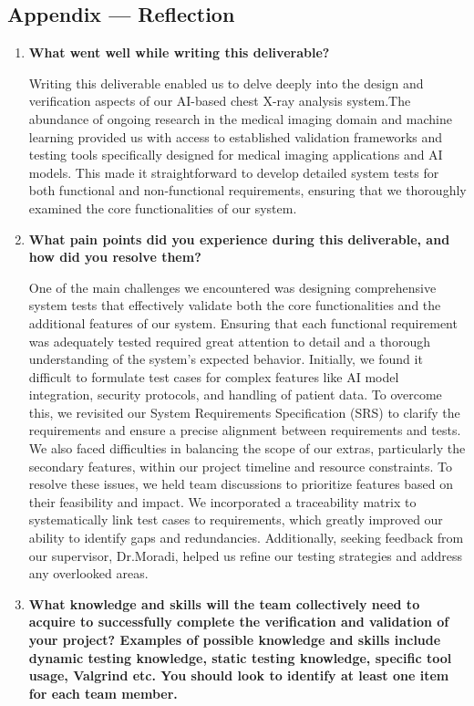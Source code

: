 \documentclass[12pt, titlepage]{article}
\begin{document}
\begin{enumerate}
\begin{enumerate}
\begin{enumerate}
\newpage{}
\section*{Appendix --- Reflection}
\begin{enumerate}
  \item \textbf{What went well while writing this deliverable?}
  
  Writing this deliverable enabled us to delve deeply into the design and verification aspects of our AI-based chest X-ray analysis system.The abundance of ongoing research in the medical imaging domain and machine learning provided us with access to established validation frameworks and testing tools specifically designed for medical imaging applications and AI models. This made it straightforward to develop detailed system tests for both functional and non-functional requirements, ensuring that we thoroughly examined the core functionalities of our system.
  \item \textbf{What pain points did you experience during this deliverable, and how
    did you resolve them?}
    
  One of the main challenges we encountered was designing comprehensive system tests that effectively validate both the core functionalities and the additional features of our system. Ensuring that each functional requirement was adequately tested required great attention to detail and a thorough understanding of the system's expected behavior. Initially, we found it difficult to formulate test cases for complex features like AI model integration, security protocols, and handling of patient data. To overcome this, we revisited our System Requirements Specification (SRS) to clarify the requirements and ensure a precise alignment between requirements and tests. We also faced difficulties in balancing the scope of our extras, particularly the secondary features, within our project timeline and resource constraints. To resolve these issues, we held team discussions to prioritize features based on their feasibility and impact. We incorporated a traceability matrix to systematically link test cases to requirements, which greatly improved our ability to identify gaps and redundancies. Additionally, seeking feedback from our supervisor, Dr.Moradi, helped us refine our testing strategies and address any overlooked areas. 
  \item \textbf{What knowledge and skills will the team collectively need to acquire to
  successfully complete the verification and validation of your project?
  Examples of possible knowledge and skills include dynamic testing knowledge,
  static testing knowledge, specific tool usage, Valgrind etc.  You should look to
  identify at least one item for each team member.}


\end{enumerate}
\end{enumerate}
\end{enumerate}
\end{enumerate}
\end{document}
